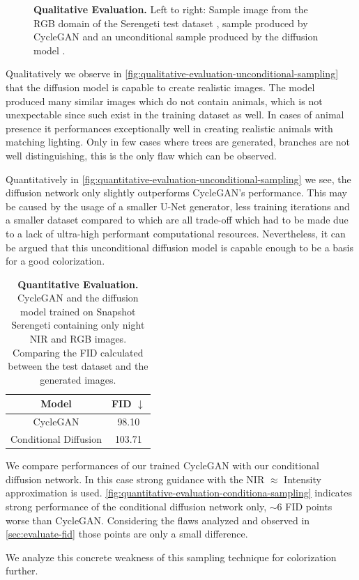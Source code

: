 \begin{figure}[htp!]
\begin{tabularx}{\textwidth}{>{\centering\arraybackslash}X >{\centering\arraybackslash}X >{\centering\arraybackslash}X >{\centering\arraybackslash}X >{\centering\arraybackslash}X >{\centering\arraybackslash}X}
    \end{tabularx}
    \caption{
        \textbf{Qualitative Evaluation.} Left to right: Sample image from the RGB domain of the Serengeti test dataset \parencite{serengeti},
        sample produced by CycleGAN \parencite{mehri} and an unconditional sample produced by the diffusion model \parencite{diffusion-beats-gans}.
    }
    \label{fig:qualitative-evaluation-unconditional-sampling}
\end{figure}

Qualitatively we observe in \autoref{fig:qualitative-evaluation-unconditional-sampling} that the diffusion model is capable to create realistic images.
The model produced many similar images which do not contain animals, which is not unexpectable since such exist in the training dataset as well.
In cases of animal presence it performances exceptionally well in creating realistic animals with matching lighting.
Only in few cases where trees are generated, branches are not well distinguishing, this is the only flaw which can be observed.

Quantitatively in \autoref{fig:quantitative-evaluation-unconditional-sampling} we see, the diffusion network only slightly outperforms CycleGAN's performance.
This may be caused by the usage of a smaller U-Net generator, less training iterations and a smaller dataset compared to \parencite{diffusion-beats-gans} which are all trade-off which
had to be made due to a lack of ultra-high performant computational resources.
Nevertheless, it can be argued that this unconditional diffusion model is capable enough to be a basis for a good colorization.


\begin{table}[htp!]
    \centering
    \begin{tabular}{c | c}
        Model                 & FID  $\downarrow$ \\
        \hline\hline
        CycleGAN              & 98.10             \\
        Conditional Diffusion & 103.71
    \end{tabular}
    \caption{
        \textbf{Quantitative Evaluation.} CycleGAN and the diffusion model trained on Snapshot Serengeti \parencite{serengeti} containing only night NIR and RGB images.
        Comparing the FID calculated between the test dataset and the generated images.
    }
    \label{fig:quantitative-evaluation-conditiona-sampling}
\end{table}

We compare performances of our trained CycleGAN with our conditional diffusion network.
In this case strong guidance with the NIR $\approx$ Intensity approximation is used.
\autoref{fig:quantitative-evaluation-conditiona-sampling} indicates strong performance of the conditional
diffusion network only, $\sim 6$ FID points worse than CycleGAN.
Considering the flaws analyzed and observed in \autoref{sec:evaluate-fid} those points are only a small difference.


We analyze this concrete weakness of this sampling technique for colorization further.